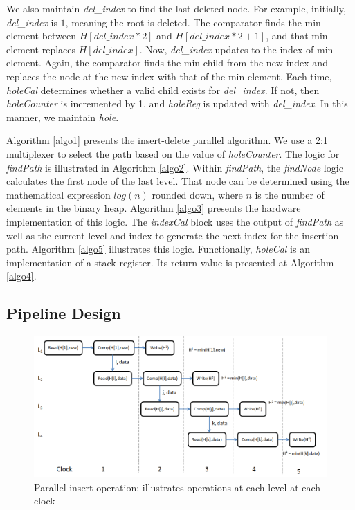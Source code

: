 We also maintain {\it del\_index} to find the last deleted node.
For example, initially, {\it del\_index} is $1$, meaning the root is deleted.
The comparator finds the min element between $H[del\_index*2]$ and $H[del\_index*2 + 1]$, and that min element replaces $H[del\_index]$.
Now, {\it del\_index} updates to the index of min element.
Again, the comparator finds the min child from the new index and replaces the node at the new index with that of the min element.
Each time, {\it holeCal} determines whether a valid child exists for {\it del\_index}.
If not, then {\it holeCounter} is incremented by 1, and {\it holeReg} is updated with {\it del\_index}.
In this manner, we maintain {\it hole}.

Algorithm \ref{algo1} presents the insert-delete parallel algorithm.
We use a 2:1 multiplexer to select the path based on the value of {\it holeCounter}.
The logic for {\it findPath} is illustrated in Algorithm \ref{algo2}.
Within {\it findPath}, the {\it findNode} logic calculates the first node of the last level.
That node can be determined using the mathematical expression $log(n)$ rounded down, where $n$ is the number of elements in the binary heap.
Algorithm \ref{algo3} presents the hardware implementation of this logic.
The {\it indexCal} block uses the output of {\it findPath} as well as the current level and index to generate the next index for the insertion path. Algorithm \ref{algo5} illustrates this logic.
Functionally, {\it holeCal} is an implementation of a stack register. Its return value is presented at Algorithm \ref{algo4}.



\subsection{Pipeline Design}
\begin{figure}[!ht]
  \centering
  \includegraphics[width=12cm]{fig/clock1.png}
      \caption{Parallel insert operation: illustrates operations at each level at each clock }
    \label{clock1}
\end{figure}

